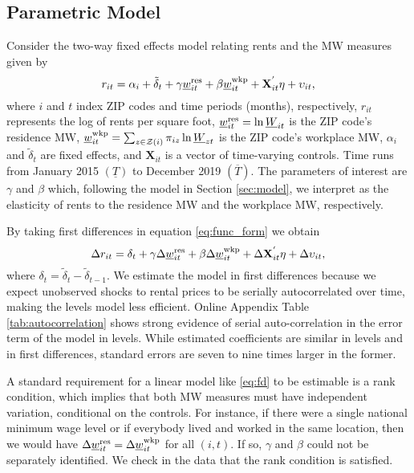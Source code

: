 \subsection{Parametric Model}

Consider the two-way fixed effects model relating rents and the MW measures
given by
\begin{equation} \label{eq:func_form}
    r_{it} = \alpha_i + \tilde{\delta}_t 
           + \gamma \underline{w}^{\text{res}}_{it} + \beta \underline{w}^{\text{wkp}}_{it}
           + \mathbf{X}^{'}_{it}\eta
           + \upsilon_{it} ,
\end{equation}    
where
$i$ and $t$ index ZIP codes and time periods (months), respectively,
$r_{it}$ represents the log of rents per square foot,
$\underline{w}^{\text{res}}_{it} = \ln \underline{W}_{it}$ is the ZIP code's residence MW,
$\underline{w}^{\text{wkp}}_{it} = \sum_{z\in\mathcal{Z}(i)} \pi_{iz}\ln \underline{W}_{zt}$ is the ZIP code's 
workplace MW,
$\alpha_i$ and $\tilde{\delta}_t$ are fixed effects, and 
$\mathbf{X}_{it}$ is a vector of time-varying controls.
Time runs from January 2015 $\left(\underline{T}\right)$ 
to December 2019 $\left(\overline{T}\right)$.
The parameters of interest are $\gamma$ and $\beta$ which, 
following the model in Section \ref{sec:model}, 
we interpret as the elasticity of rents to the residence MW and the workplace MW, 
respectively.

By taking first differences in equation \eqref{eq:func_form} we obtain
\begin{equation}\label{eq:fd}
    \Delta r_{it} = \delta_t
                  + \gamma \Delta \underline{w}^{\text{res}}_{it} + \beta \Delta \underline{w}^{\text{wkp}}_{it}
                  + \Delta \mathbf{X}^{'}_{it}\eta
                  + \Delta \upsilon_{it} ,
\end{equation}
where $\delta_t = \tilde{\delta}_t - \tilde{\delta}_{t-1}$.
We estimate the model in first differences because we expect unobserved shocks
to rental prices to be serially autocorrelated over time, making the levels
model less efficient.
Online Appendix Table \ref{tab:autocorrelation} shows strong evidence of serial 
auto-correlation in the error term of the model in levels.
While estimated coefficients are similar in levels and in first differences, 
standard errors are seven to nine times larger in the former.

A standard requirement for a linear model like \eqref{eq:fd} to be
estimable is a rank condition, which implies that both MW measures must have 
independent variation, conditional on the controls.
For instance, if there were a single national minimum wage level or if everybody 
lived and worked in the same location, then we would have
$\Delta \underline{w}^{\text{res}}_{it} = \Delta \underline{w}^{\text{wkp}}_{it}$ for all $(i,t)$.
If so, $\gamma$ and $\beta$ could not be separately identified.
We check in the data that the rank condition is satisfied.

